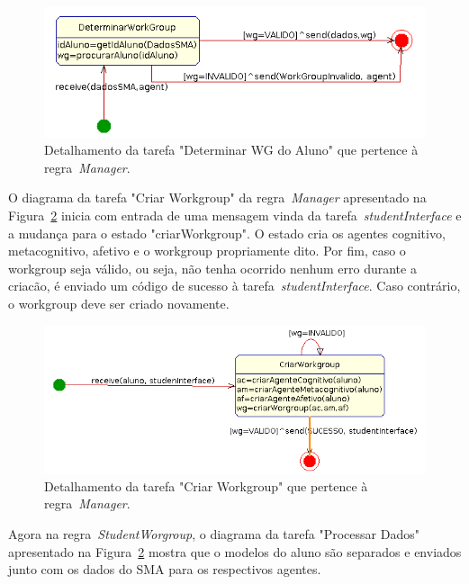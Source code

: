 \begin{figure}
	\centering
	\includegraphics[scale=0.48]{images/td-determinar-wg.png}
	\caption{Detalhamento da tarefa "Determinar WG do Aluno" que pertence à regra~\emph{Manager}.}
	\label{fig:td-determinar-wg}
\end{figure}

O diagrama da tarefa "Criar Workgroup" da regra~\emph{Manager} apresentado na Figura~\ref{fig:td-criar-wg} inicia com entrada de uma mensagem vinda da tarefa~\emph{studentInterface} e a mudança para o estado "criarWorkgroup". O estado cria os agentes cognitivo, metacognitivo, afetivo e o workgroup propriamente dito. Por fim, caso o workgroup seja válido, ou seja, não tenha ocorrido nenhum erro durante a criacão, é enviado um código de sucesso à tarefa~\emph{studentInterface}. Caso contrário, o workgroup deve ser criado novamente.

\begin{figure}
	\centering
	\includegraphics[scale=0.48]{images/td-criar-wg.png}
	\caption{Detalhamento da tarefa "Criar Workgroup" que pertence à regra~\emph{Manager}.}
	\label{fig:td-criar-wg}
\end{figure}

Agora na regra~\emph{StudentWorgroup}, o diagrama da tarefa "Processar Dados" apresentado na Figura~\ref{fig:td-criar-wg} mostra que o modelos do aluno são separados e enviados junto com os dados do SMA para os respectivos agentes.

